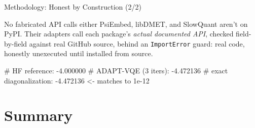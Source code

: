 \documentclass[
  ignorenonframetext,
  aspectratio=169,
]{beamer}
\newenvironment{Shaded}{\begin{snugshade}}{\end{snugshade}}
\newcommand{\CommentTok}[1]{\textcolor[rgb]{0.48,0.49,0.49}{#1}}
\begin{document}
\begin{frame}[fragile]{Methodology: Honest by Construction (2/2)}
\label{methodology-honest-by-construction-22}
\footnotesize
\begin{block}{No fabricated API calls either}
PsiEmbed, libDMET, and SlowQuant aren't on PyPI. Their adapters call each package's \emph{actual documented API}, checked field-by-field against real GitHub source, behind an \texttt{ImportError} guard: real code, honestly unexecuted until installed from source.
\end{block}
\normalsize

\begin{Shaded}
\begin{Highlighting}[]
\CommentTok{\# HF reference:          {-}4.000000}
\CommentTok{\# ADAPT{-}VQE (3 iters):   {-}4.472136}
\CommentTok{\# exact diagonalization: {-}4.472136   \textless{}{-} matches to 1e{-}12}
\end{Highlighting}
\end{Shaded}
\end{frame}

\section{Summary}\label{summary}
\end{document}
